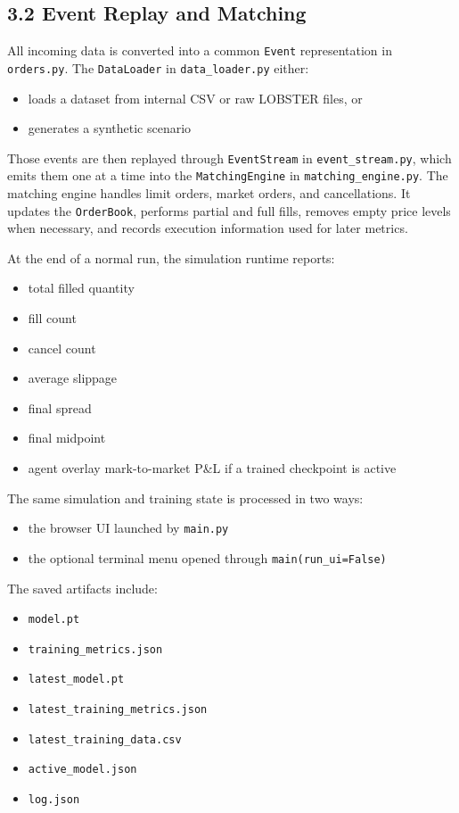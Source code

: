 \documentclass[11pt]{article}
\begin{document}
\subsection*{3.2 Event Replay and Matching}
All incoming data is converted into a common \texttt{Event} representation in
\texttt{orders.py}. The \texttt{DataLoader} in \texttt{data\_loader.py} either:
\begin{itemize}
    \item loads a dataset from internal CSV or raw LOBSTER files, or
    \item generates a synthetic scenario
\end{itemize}

Those events are then replayed through \texttt{EventStream} in
\texttt{event\_stream.py}, which emits them one at a time into the
\texttt{MatchingEngine} in \texttt{matching\_engine.py}. The matching engine
handles limit orders, market orders, and cancellations. It updates the
\texttt{OrderBook}, performs partial and full fills, removes empty price levels
when necessary, and records execution information used for later metrics.

At the end of a normal run, the simulation runtime reports:
\begin{itemize}
    \item total filled quantity
    \item fill count
    \item cancel count
    \item average slippage
    \item final spread
    \item final midpoint
    \item agent overlay mark-to-market P\&L if a trained checkpoint is active
\end{itemize}

The same simulation and training state is processed in two ways:
\begin{itemize}
    \item the browser UI launched by \texttt{main.py}
    \item the optional terminal menu opened through
    \texttt{main(run\_ui=False)}
\end{itemize}

The saved artifacts include:
\begin{itemize}
    \item \texttt{model.pt}
    \item \texttt{training\_metrics.json}
    \item \texttt{latest\_model.pt}
    \item \texttt{latest\_training\_metrics.json}
    \item \texttt{latest\_training\_data.csv}
    \item \texttt{active\_model.json}
    \item \texttt{log.json}
\end{itemize}
\end{document}
